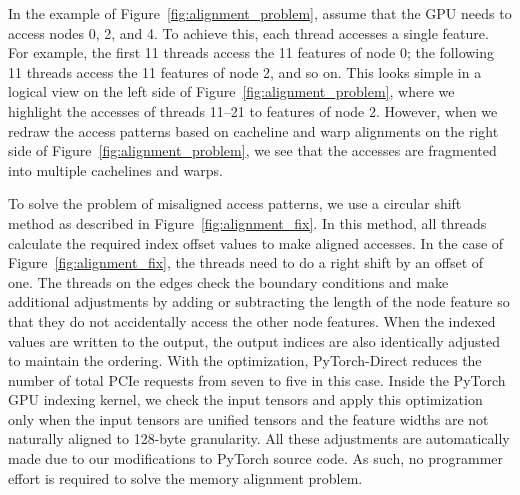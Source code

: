 In the example of Figure~\ref{fig:alignment_problem}, assume that the GPU needs to access nodes 0, 2, and 4.
To achieve this, each thread accesses a single feature.
For example, the first 11 threads access the 11 features of node 0; the following 11 threads access the 11 features of node 2, and so on.
This looks simple in a logical view on the left side of Figure~\ref{fig:alignment_problem}, where we highlight the accesses of threads 11--21 to features of node 2.
However, when we redraw the access patterns based on cacheline and warp alignments on the right side of Figure~\ref{fig:alignment_problem}, we see that the accesses are fragmented into multiple cachelines and warps.

To solve the problem of misaligned access patterns, we use a circular shift method as described in Figure~\ref{fig:alignment_fix}.
In this method, all threads calculate the required index offset values to make aligned accesses.
In the case of Figure~\ref{fig:alignment_fix}, the threads need to do a right shift by an offset of one.
The threads on the edges check the boundary conditions and make additional adjustments by adding or subtracting the length of the node feature so that they do not accidentally access the other node features.
When the indexed values are written to the output, the output indices are also identically adjusted to maintain the ordering.
With the optimization, PyTorch-Direct reduces the number of total PCIe requests from seven to five in this case.
Inside the PyTorch GPU indexing kernel, we check the input tensors and apply this optimization only when the input tensors are unified tensors and the feature widths are not naturally aligned to 128-byte granularity.
All these adjustments are automatically made due to our modifications to PyTorch source code. As such, no programmer effort is required to solve the memory alignment problem.


